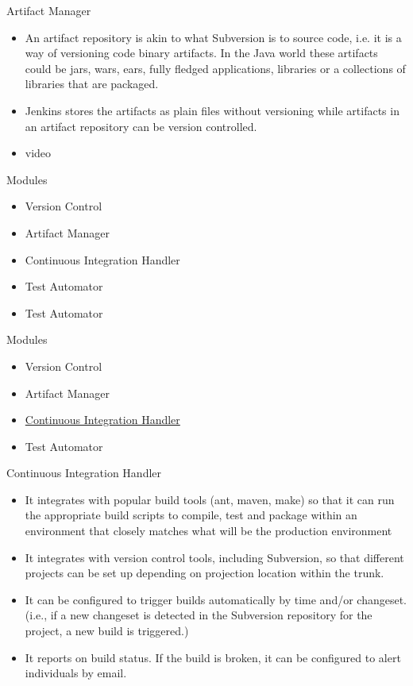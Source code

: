 \documentclass{beamer}
\begin{document}
\begin{frame}{Artifact Manager}
\begin{itemize}
\item An artifact repository is akin to what Subversion is to source code, i.e. it is a way of versioning code binary artifacts. In the Java world these artifacts could be jars, wars, ears, fully fledged applications, libraries or a collections of libraries that are packaged.
\vspace{0.5 cm}
\item Jenkins stores the artifacts as plain files without versioning while artifacts in an artifact repository can be version controlled.
\vspace{0.5 cm}
\item video
\end{itemize}
\end{frame}


\begin{frame}{Modules}
\begin{itemize}
\item Version Control
\item Artifact Manager
\item Continuous Integration Handler
\item Test Automator
\item Test Automator
\end{itemize}

\end{frame}

\begin{frame}{Modules}
\begin{itemize}
\item Version Control
\item Artifact Manager
\item \underline{Continuous Integration Handler}
\item Test Automator

\end{itemize}

\end{frame}

\begin{frame}{Continuous Integration Handler}
\begin{itemize}
\item  It integrates with popular build tools (ant, maven, make) so that it can run the appropriate
build scripts to compile, test and package within an environment that closely
matches what will be the production environment
\item It integrates with version control tools, including Subversion, so that different projects
can be set up depending on projection location within the trunk.
\item It can be configured to trigger builds automatically by time and/or changeset. (i.e.,
if a new changeset is detected in the Subversion repository for the project, a new
build is triggered.)
\item It reports on build status. If the build is broken, it can be configured to alert individuals
by email.
\end{itemize}
\end{frame}
\end{document}

